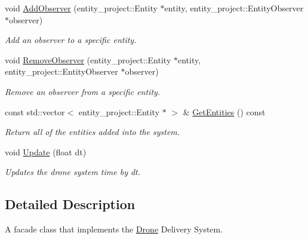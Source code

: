 \begin{DoxyCompactItemize}
\mbox{\label{classcsci3081_1_1DroneSimulation_a4e82dd6f5f354564e06b59d82c2056f8}} 
void \hyperlink{classcsci3081_1_1DroneSimulation_a4e82dd6f5f354564e06b59d82c2056f8}{Add\+Observer} (entity\+\_\+project\+::\+Entity $\ast$entity, entity\+\_\+project\+::\+Entity\+Observer $\ast$observer)
\begin{DoxyCompactList}\small\item\em Add an observer to a specific entity. \end{DoxyCompactList}\item 
\mbox{\label{classcsci3081_1_1DroneSimulation_ab796fda32c7fcd8d74e9971baf5cd608}} 
void \hyperlink{classcsci3081_1_1DroneSimulation_ab796fda32c7fcd8d74e9971baf5cd608}{Remove\+Observer} (entity\+\_\+project\+::\+Entity $\ast$entity, entity\+\_\+project\+::\+Entity\+Observer $\ast$observer)
\begin{DoxyCompactList}\small\item\em Remove an observer from a specific entity. \end{DoxyCompactList}\item 
\mbox{\label{classcsci3081_1_1DroneSimulation_aa9de1fa9d2090000445a093bea37ded3}} 
const std\+::vector$<$ entity\+\_\+project\+::\+Entity $\ast$ $>$ \& \hyperlink{classcsci3081_1_1DroneSimulation_aa9de1fa9d2090000445a093bea37ded3}{Get\+Entities} () const
\begin{DoxyCompactList}\small\item\em Return all of the entities added into the system. \end{DoxyCompactList}\item 
\mbox{\label{classcsci3081_1_1DroneSimulation_a17933be5048c3c2cfbcee77366bf87b9}} 
void \hyperlink{classcsci3081_1_1DroneSimulation_a17933be5048c3c2cfbcee77366bf87b9}{Update} (float dt)
\begin{DoxyCompactList}\small\item\em Updates the drone system time by dt. \end{DoxyCompactList}\end{DoxyCompactItemize}


\subsection{Detailed Description}
A facade class that implements the \hyperlink{classcsci3081_1_1Drone}{Drone} Delivery System. 

